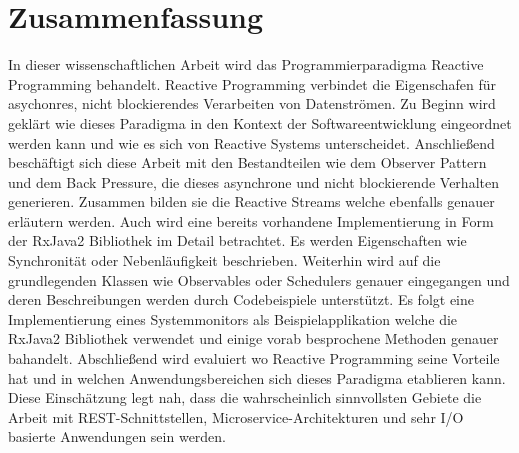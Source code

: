 \pagestyle{empty} %


\section*{Zusammenfassung} %
\label{cha:zusammenfassung}
In dieser wissenschaftlichen Arbeit wird das Programmierparadigma Reactive Programming behandelt. Reactive Programming verbindet die Eigenschafen für asychonres, nicht blockierendes Verarbeiten von Datenströmen. Zu Beginn wird geklärt wie dieses Paradigma in den Kontext der Softwareentwicklung eingeordnet werden kann und wie es sich von Reactive Systems unterscheidet. Anschließend beschäftigt sich diese Arbeit mit den Bestandteilen wie dem Observer Pattern und dem Back Pressure, die dieses asynchrone und nicht blockierende Verhalten generieren. Zusammen bilden sie die Reactive Streams welche ebenfalls genauer erläutern werden. Auch wird eine bereits vorhandene Implementierung in Form der RxJava2 Bibliothek im Detail betrachtet. Es werden Eigenschaften wie Synchronität oder Nebenläufigkeit beschrieben. Weiterhin wird auf die grundlegenden Klassen wie Observables oder Schedulers genauer eingegangen und deren Beschreibungen werden durch Codebeispiele unterstützt. Es folgt eine Implementierung eines Systemmonitors als Beispielapplikation welche die RxJava2 Bibliothek verwendet und einige vorab besprochene Methoden genauer bahandelt. Abschließend wird evaluiert wo Reactive Programming seine Vorteile hat und in welchen Anwendungsbereichen sich dieses Paradigma etablieren kann. Diese Einschätzung legt nah, dass die wahrscheinlich sinnvollsten Gebiete die Arbeit mit REST-Schnittstellen, Microservice-Architekturen und sehr I/O basierte Anwendungen sein werden.


\vspace*{2cm}
